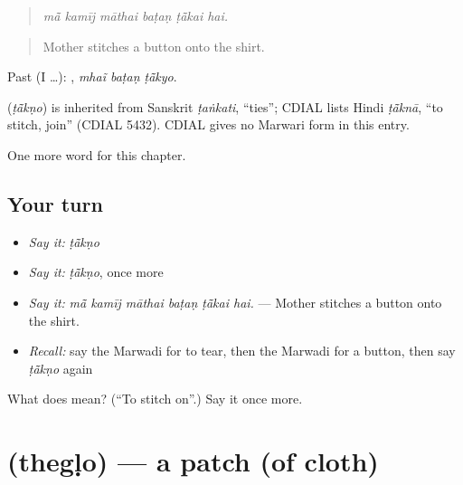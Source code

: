 \begin{quote}
     
\end{quote}

\begin{quote}
\emph{mā̃ kamīj māthai baṭaṇ ṭā̃kai hai.}
\end{quote}

\begin{quote}
Mother stitches a button onto the shirt.
\end{quote}

Past (I …):   , \emph{mhaĩ baṭaṇ ṭā̃kyo}.

\begin{cousinweb}
\textbf{} (\emph{ṭā̃kṇo}) is inherited from Sanskrit \emph{ṭaṅkati}, \textquotedblleft{}ties\textquotedblright{}; CDIAL lists Hindi \emph{ṭā̃knā}, \textquotedblleft{}to stitch, join\textquotedblright{} (CDIAL 5432). CDIAL gives no Marwari form in this entry.
\end{cousinweb}

\begin{grammarlens}[title={What you've built}]
One more word for this chapter.
\end{grammarlens}

\subsection*{Your turn}
\begin{itemize}
\raggedright
  \item \emph{Say it:} \emph{ṭā̃kṇo}
  \item \emph{Say it:} \emph{ṭā̃kṇo}, once more
  \item \emph{Say it:} \emph{mā̃ kamīj māthai baṭaṇ ṭā̃kai hai.} — Mother stitches a button onto the shirt.
  \item \emph{Recall:} say the Marwadi for to tear, then the Marwadi for a button, then say \emph{ṭā̃kṇo} again
\end{itemize}

\begin{tcolorbox}[breakable,colback=teal!4,colframe=teal!35!black,title={Before you move on}]
What does  mean? (\textquotedblleft{}To stitch on\textquotedblright{}.) Say it once more.
\end{tcolorbox}
\section[\texorpdfstring{\mw{थेगळो} (thegḷo)}{थेगळो (thegḷo)}]{ (thegḷo) — a patch (of cloth)}

